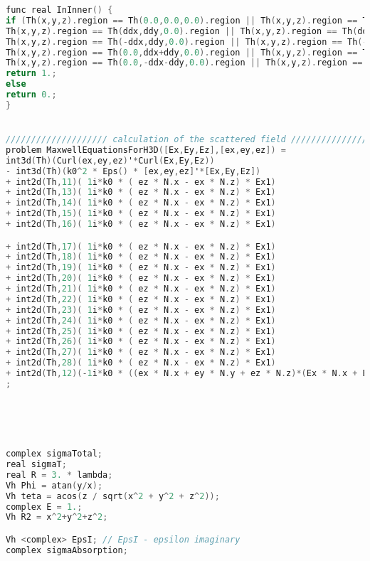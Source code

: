 \begin{lstlisting}[language=C]
func real InInner() {
if (Th(x,y,z).region == Th(0.0,0.0,0.0).region || Th(x,y,z).region == Th(ddx,0.0,0.0).region || Th(x,y,z).region == Th(-ddx,0.0,0.0).region || Th(x,y,z).region == Th(0.0, ddx, 0.0).region || Th(x,y,z).region == Th(0.0,-ddx,0.0).region ||
Th(x,y,z).region == Th(ddx,ddy,0.0).region || Th(x,y,z).region == Th(ddx+ddy,0.0,0.0).region || Th(x,y,z).region == Th(ddx,-ddy,0.0).region ||
Th(x,y,z).region == Th(-ddx,ddy,0.0).region || Th(x,y,z).region == Th(-ddx-ddy,0.0,0.0).region || Th(x,y,z).region == Th(-ddx,-ddy,0.0).region ||
Th(x,y,z).region == Th(0.0,ddx+ddy,0.0).region || Th(x,y,z).region == Th(ddy,ddx,0.0).region || Th(x,y,z).region == Th(-ddy,ddx,0.0).region ||
Th(x,y,z).region == Th(0.0,-ddx-ddy,0.0).region || Th(x,y,z).region == Th(ddy,-ddx,0.0).region || Th(x,y,z).region == Th(-ddy,-ddx,0.0).region)
return 1.;
else 
return 0.;
}


//////////////////// calculation of the scattered field /////////////////////  
problem MaxwellEquationsForH3D([Ex,Ey,Ez],[ex,ey,ez]) =
int3d(Th)(Curl(ex,ey,ez)'*Curl(Ex,Ey,Ez))
- int3d(Th)(k0^2 * Eps() * [ex,ey,ez]'*[Ex,Ey,Ez])
+ int2d(Th,11)( 1i*k0 * ( ez * N.x - ex * N.z) * Ex1)
+ int2d(Th,13)( 1i*k0 * ( ez * N.x - ex * N.z) * Ex1)
+ int2d(Th,14)( 1i*k0 * ( ez * N.x - ex * N.z) * Ex1)
+ int2d(Th,15)( 1i*k0 * ( ez * N.x - ex * N.z) * Ex1)
+ int2d(Th,16)( 1i*k0 * ( ez * N.x - ex * N.z) * Ex1)

+ int2d(Th,17)( 1i*k0 * ( ez * N.x - ex * N.z) * Ex1)
+ int2d(Th,18)( 1i*k0 * ( ez * N.x - ex * N.z) * Ex1)
+ int2d(Th,19)( 1i*k0 * ( ez * N.x - ex * N.z) * Ex1)
+ int2d(Th,20)( 1i*k0 * ( ez * N.x - ex * N.z) * Ex1)
+ int2d(Th,21)( 1i*k0 * ( ez * N.x - ex * N.z) * Ex1)
+ int2d(Th,22)( 1i*k0 * ( ez * N.x - ex * N.z) * Ex1)
+ int2d(Th,23)( 1i*k0 * ( ez * N.x - ex * N.z) * Ex1)
+ int2d(Th,24)( 1i*k0 * ( ez * N.x - ex * N.z) * Ex1)
+ int2d(Th,25)( 1i*k0 * ( ez * N.x - ex * N.z) * Ex1)
+ int2d(Th,26)( 1i*k0 * ( ez * N.x - ex * N.z) * Ex1)
+ int2d(Th,27)( 1i*k0 * ( ez * N.x - ex * N.z) * Ex1)
+ int2d(Th,28)( 1i*k0 * ( ez * N.x - ex * N.z) * Ex1)
+ int2d(Th,12)(-1i*k0 * ((ex * N.x + ey * N.y + ez * N.z)*(Ex * N.x + Ey * N.y + Ez * N.z) - (Ex * ex + Ey * ey + Ez * ez)))
;





complex sigmaTotal;
real sigmaT;
real R = 3. * lambda;
Vh Phi = atan(y/x);
Vh teta = acos(z / sqrt(x^2 + y^2 + z^2));
complex E = 1.;
Vh R2 = x^2+y^2+z^2;

Vh <complex> EpsI; // EpsI - epsilon imaginary
complex sigmaAbsorption;


\end{lstlisting}
